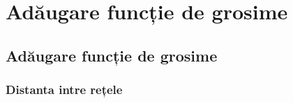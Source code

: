 \chapter{Adăugare funcție de grosime}\label{chapter:grosime}

\section{Adăugare funcție de grosime}

\subsection{Distanta intre rețele}